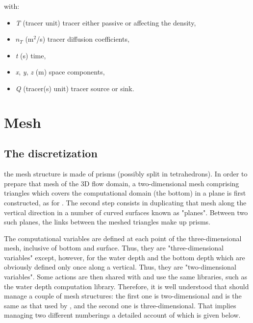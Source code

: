 with:

\begin{itemize}
\item \textit{T} (tracer unit) tracer either passive or affecting the density,

\item $n_{T}$  (m${}^{2}$/s) tracer diffusion coefficients,

\item \textit{t}  (s) time,

\item \textit{x}, \textit{y}, \textit{z} (m) space components,

\item \textit{Q} (tracer(s) unit) tracer source or sink.
\end{itemize}


\section{Mesh}


\subsection{The discretization}

the  mesh structure is made of prisms (possibly split in
tetrahedrons). In order to prepare that mesh of the 3D flow domain, a
two-dimensional mesh comprising triangles which covers the computational domain
(the bottom) in a plane is first constructed, as for . The second
step consists in duplicating that mesh along the vertical direction in a number
of curved surfaces known as "planes". Between two such planes, the links
between the meshed triangles make up prisms.

The computational variables are defined at each point of the three-dimensional
mesh, inclusive of bottom and surface. Thus, they are "three-dimensional
variables" except, however, for the water depth and the bottom depth which are
obviously defined only once along a vertical. Thus, they are "two-dimensional
variables". Some  actions are then shared with  and use the
same libraries, such as the water depth computation library. Therefore, it is
well understood that  should manage a couple of mesh structures: the
first one is two-dimensional and is the same as that used by , and
the second one is three-dimensional. That implies managing two different
numberings a detailed account of which is given below.


